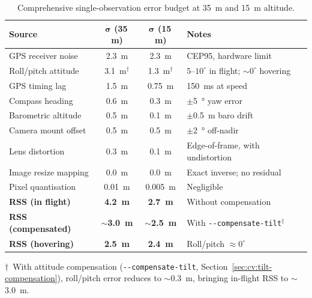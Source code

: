 \documentclass[10pt,a4paper]{article}
\begin{document}
\begin{table}[ht]
  \centering
  \caption{Comprehensive single-observation error budget at \SI{35}{\metre} and \SI{15}{\metre} altitude.}\label{tab:error-budget}
  \begin{tabular}{@{}lccl@{}}
    \toprule
    \textbf{Source} & $\boldsymbol{\sigma}$ \textbf{(35\,m)} & $\boldsymbol{\sigma}$ \textbf{(15\,m)} & \textbf{Notes} \\
    \midrule
    GPS receiver noise     & \SI{2.3}{\metre} & \SI{2.3}{\metre} & CEP95, hardware limit \\
    Roll/pitch attitude    & \SI{3.1}{\metre}$^\dagger$ & \SI{1.3}{\metre}$^\dagger$ & $5\text{--}10^{\circ}$ in flight; ${\sim}0^{\circ}$ hovering \\
    GPS timing lag         & \SI{1.5}{\metre} & \SI{0.75}{\metre} & \SI{150}{\milli\second} at speed \\
    Compass heading        & \SI{0.6}{\metre} & \SI{0.3}{\metre} & $\pm$\SI{5}{\degree} yaw error \\
    Barometric altitude    & \SI{0.5}{\metre} & \SI{0.1}{\metre} & $\pm$\SI{0.5}{\metre} baro drift \\
    Camera mount offset    & \SI{0.5}{\metre} & \SI{0.5}{\metre} & $\pm$\SI{2}{\degree} off-nadir \\
    Lens distortion        & \SI{0.3}{\metre} & \SI{0.1}{\metre} & Edge-of-frame, with undistortion \\
    Image resize mapping   & \SI{0.0}{\metre} & \SI{0.0}{\metre} & Exact inverse; no residual \\
    Pixel quantisation     & \SI{0.01}{\metre} & \SI{0.005}{\metre} & Negligible \\
    \midrule
    \textbf{RSS (in flight)}   & \textbf{\SI{4.2}{\metre}} & \textbf{\SI{2.7}{\metre}} & Without compensation \\
    \textbf{RSS (compensated)} & \textbf{$\sim$\SI{3.0}{\metre}} & \textbf{$\sim$\SI{2.5}{\metre}} & With \texttt{-{}-compensate-tilt}$^\dagger$ \\
    \textbf{RSS (hovering)}    & \textbf{\SI{2.5}{\metre}} & \textbf{\SI{2.4}{\metre}} & Roll/pitch $\approx 0^{\circ}$ \\
    \bottomrule
  \end{tabular}

  {\footnotesize $\dagger$~With attitude compensation (\texttt{-{}-compensate-tilt}, Section~\ref{sec:cv:tilt-compensation}), roll/pitch error reduces to ${\sim}$\SI{0.3}{\metre}, bringing in-flight RSS to ${\sim}$\SI{3.0}{\metre}.}
\end{table}
\end{document}
